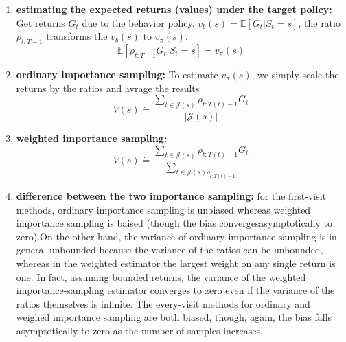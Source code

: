 \begin{enumerate}
	\item \textbf{estimating the expected returns (values) under the target policy:} Get returns $G_t$ due to the behavior policy. $v_b(s) = \mathbb{E}[G_t|S_t=s]$, the ratio $\rho_{t:T-1}$ transforms the $v_b(s)$ to $v_{\pi}(s)$.
	\begin{equation}
	\mathbb{E}[\rho_{t:T-1}G_t|S_t=s]=v_{\pi}(s)
	\end{equation} 

	\item \textbf{ordinary importance sampling:} To estimate $v_{\pi}(s)$, we simply scale the returns by the ratios and avrage the results
	\begin{equation}
	V(s) \dot{=} \frac{\sum_{t \in \mathcal{J}(s)}\rho_{t:T(t)-1}G_t}{|\mathcal{J}(s)|}
	\end{equation}

	\item \textbf{weighted importance sampling:}
	\begin{equation}
	V(s) \dot{=} \frac{\sum_{t \in \mathcal{J}(s)}\rho_{t:T(t)-1}G_t}{\sum_{t \in \mathcal{J}(s)\rho_{t:T(t)-1}}}
	\end{equation}

	\item \textbf{difference between the two importance sampling:} for the first-visit methods, ordinary importance sampling is unbiased whereas weighted importance sampling is baised (though the bias convergesasymptotically to zero).On the other hand, the variance of ordinary importance sampling is in general unbounded because the variance of the ratios can be unbounded, whereas in the weighted estimator the largest weight on any single return is one. In fact, assuming bounded returns, the variance of the weighted importance-sampling estimator converges to zero even if the variance of the ratios themselves is infinite. The every-visit methods for ordinary and weighed importance sampling are both biased, though, again, the bias falls asymptotically to zero as the number of samples increases.

\end{enumerate}